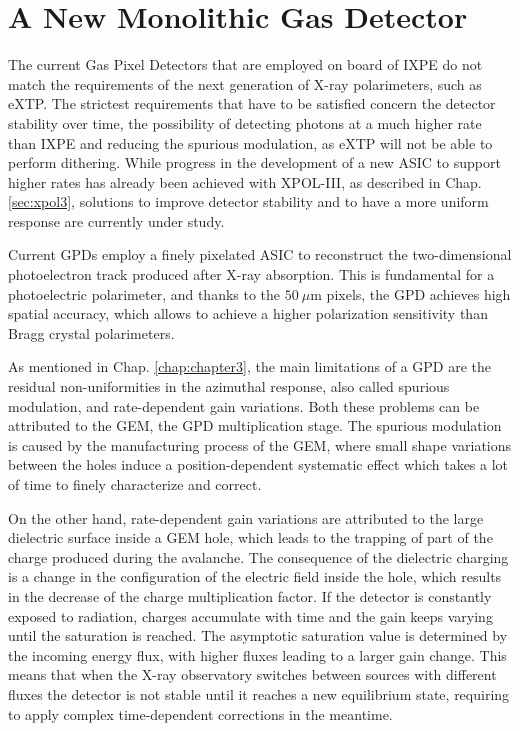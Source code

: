 \chapter{A New Monolithic Gas Detector}
\label{chap:chapter5}

The current Gas Pixel Detectors that are employed on board of IXPE do not match the requirements of the next generation of X-ray polarimeters, such as eXTP. The strictest requirements that have to be satisfied concern the detector stability over time, the possibility of detecting photons at a much higher rate than IXPE and reducing the spurious modulation, as eXTP will not be able to perform dithering. While progress in the development of a new ASIC to support higher rates has already been achieved with XPOL-III, as described in Chap. \ref{sec:xpol3}, solutions to improve detector stability and to have a more uniform response are currently under study.

Current GPDs employ a finely pixelated ASIC to reconstruct the two-dimensional photoelectron track produced after X-ray absorption. This is fundamental for a photoelectric polarimeter, and thanks to the $50~\mu\text{m}$ pixels, the GPD achieves high spatial accuracy, which allows to achieve a higher polarization sensitivity than Bragg crystal polarimeters.

As mentioned in Chap. \ref{chap:chapter3}, the main limitations of a GPD are the residual non-uniformities in the azimuthal response, also called spurious modulation, and rate-dependent gain variations. Both these problems can be attributed to the GEM, the GPD multiplication stage. The spurious modulation is caused by the manufacturing process of the GEM, where small shape variations between the holes induce a position-dependent systematic effect which takes a lot of time to finely characterize and correct.

On the other hand, rate-dependent gain variations are attributed to the large dielectric surface inside a GEM hole, which leads to the trapping of part of the charge produced during the avalanche. The consequence of the dielectric charging is a change in the configuration of the electric field inside the hole, which results in the decrease of the charge multiplication factor. If the detector is constantly exposed to radiation, charges accumulate with time and the gain keeps varying until the saturation is reached. The asymptotic saturation value is determined by the incoming energy flux, with higher fluxes leading to a larger gain change. This means that when the X-ray observatory switches between sources with different fluxes the detector is not stable until it reaches a new equilibrium state, requiring to apply complex time-dependent corrections in the meantime.

